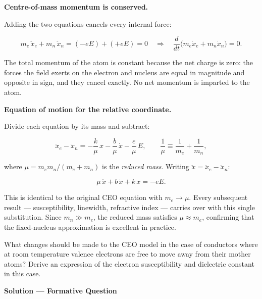 \textbf{Centre-of-mass momentum is conserved.}

Adding the two equations cancels every internal force:

\begin{equation*}
  m_e\,\ddot{x}_e + m_n\,\ddot{x}_n = (-eE) + (+eE) = 0
  \quad\Longrightarrow\quad
  \frac{d}{dt}\bigl(m_e\dot{x}_e + m_n\dot{x}_n\bigr) = 0.
\end{equation*}

The total momentum of the atom is constant because the net charge is zero: the forces the field exerts on the electron and nucleus are equal in magnitude and opposite in sign, and they cancel exactly. No net momentum is imparted to the atom.

\textbf{Equation of motion for the relative coordinate.}

Divide each equation by its mass and subtract:

\begin{equation*}
  \ddot{x}_e - \ddot{x}_n = -\frac{k}{\mu}\,x - \frac{b}{\mu}\,\dot{x} - \frac{e}{\mu}\,E,
  \qquad \frac{1}{\mu} \equiv \frac{1}{m_e} + \frac{1}{m_n},
\end{equation*}

where $\mu = m_e m_n/(m_e + m_n)$ is the \emph{reduced mass}. Writing $\ddot{x} = \ddot{x}_e - \ddot{x}_n$:

\begin{equation*}
  \boxed{\mu\,\ddot{x} + b\,\dot{x} + k\,x = -eE.}
\end{equation*}

This is identical to the original CEO equation with $m_e \to \mu$. Every subsequent result --- susceptibility, linewidth, refractive index --- carries over with this single substitution. Since $m_n \gg m_e$, the reduced mass satisfies $\mu \approx m_e$, confirming that the fixed-nucleus approximation is excellent in practice.


\begin{question}What changes should be made to the CEO model in the case
of conductors where at room temperature valence electrons are free to move away from their mother
atoms? Derive an expression of the electron susceptibility and dielectric constant in this case.
\end{question}

\textbf{\large Solution --- Formative Question}

